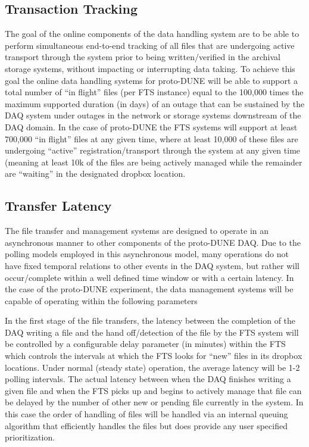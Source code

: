 \documentclass[pdftex,12pt,letter]{article}
\begin{document}
\subsection{Transaction Tracking}
The goal of the online components of the data handling system are to be able to perform simultaneous end-to-end tracking of all files that are undergoing active transport through the system prior to being written/verified in the archival storage systems, without impacting or interrupting data taking.  To achieve this goal the online data handling systems for proto-DUNE will be able to support a total number of “in flight” files (per FTS instance) equal to the 100,000 times the maximum supported duration (in days) of an outage that can be sustained by the DAQ system under outages in the network or storage systems downstream of the DAQ domain.  In the case of proto-DUNE the FTS systems will support at least 700,000 “in flight” files at any given time, where at least 10,000 of these files are undergoing “active” registration/transport through the system at any given time (meaning at least 10k of the files are being actively managed while the remainder are “waiting” in the designated dropbox location.

\subsection{Transfer Latency}
The file transfer and management systems are designed to operate in an asynchronous manner to other components of the proto-DUNE DAQ.  Due to the polling models employed in this asynchronous model, many operations do not have fixed temporal relations to other events in the DAQ system, but rather will occur/complete within a well defined time window or with a certain latency.  In the case of the proto-DUNE experiment, the data management systems will be capable of operating within the following parameters

In the first stage of the file transfers, the latency between the completion of the DAQ writing a file and the hand off/detection of the file by the FTS system will be controlled by a configurable delay parameter (in minutes) within the FTS which controls the intervals at which the FTS looks for “new” files in its dropbox locations.  Under normal (steady state) operation, the average latency will be 1-2 polling intervals.  The actual latency between when the DAQ finishes writing a given file and when the FTS picks up and begins to actively manage that file can be delayed by the number of other new or pending file currently in the system.  In this case the order of handling of files will be handled via an internal queuing algorithm that efficiently handles the files but does provide any user specified prioritization.
\end{document}
